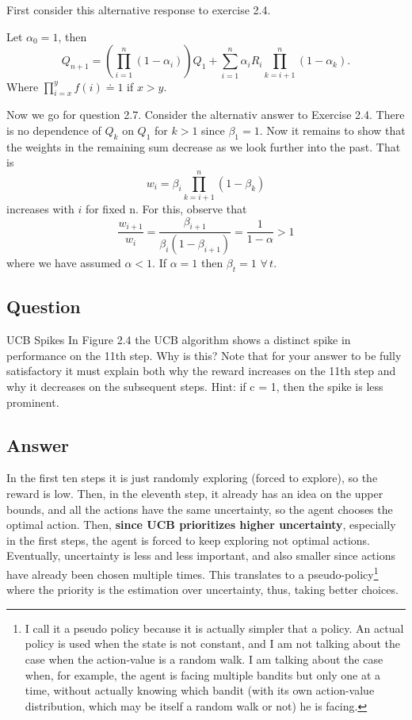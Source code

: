 \documentclass{article}
\begin{document}
First consider this alternative response to exercise 2.4.

Let $\alpha_0 = 1$, then 
\begin{equation}
    Q_{n + 1} = \left(\prod_{i=1}^n (1 - \alpha_i) \right) Q_1 + \sum_{i = 1}^{n}  \alpha_{i} R_{i} \prod_{k = i + 1}^n
(1 - \alpha_k).
\end{equation}
Where $\prod_{i=x}^y f(i) \doteq 1$ if $x > y$.

Now we go for question 2.7. Consider the alternativ answer to Exercise 2.4. There is no dependence of $Q_k$ on $Q_1$ for $k > 1$ since $\beta_1 = 1$. Now it remains to show that the weights in the remaining sum decrease as we look further into the past. That is
\begin{equation}
    w_i = \beta_i \prod_{k = i + 1}^{n} (1 - \beta_k)
\end{equation}
increases with $i$ for fixed n. For this, observe that
\begin{equation}
    \frac{w_{i+1}}{w_i} = \frac{\beta_{i+1}}{\beta_i(1 - \beta_{i + 1})} = \frac{1}{1 - \alpha} > 1
\end{equation} 
where we have assumed $\alpha < 1$. If $\alpha = 1$ then $\beta_t = 1 \,\, \forall \, t$.


    \subsection{Question}
    UCB Spikes In Figure 2.4 the UCB algorithm shows a distinct spike
    in performance on the 11th step. Why is this? Note that for your answer to be fully
    satisfactory it must explain both why the reward increases on the 11th step and why it
    decreases on the subsequent steps. Hint: if c = 1, then the spike is less prominent.

    \subsection*{Answer}
  In the first ten steps it is just randomly exploring (forced to explore), so the reward is low. Then, in the eleventh step, it already has an idea on the upper bounds, and all the actions have the same uncertainty, so the agent chooses the optimal action. Then, {\bf since UCB prioritizes higher uncertainty}, especially in the first steps, the agent is forced to keep exploring not optimal actions. Eventually, uncertainty is less and less important, and also smaller since actions have already been chosen multiple times. This translates to a pseudo-policy\footnote{I call it a pseudo policy because it is actually simpler that a policy. An actual policy is used when the state is not constant, and I am not talking about the case when the action-value is a random walk. I am talking about the case when, for example, the agent is facing multiple bandits but only one at a time, without actually knowing which bandit (with its own action-value distribution, which may be itself a random walk or not) he is facing.} where the priority is the estimation over uncertainty, thus, taking better choices.
\end{document}
